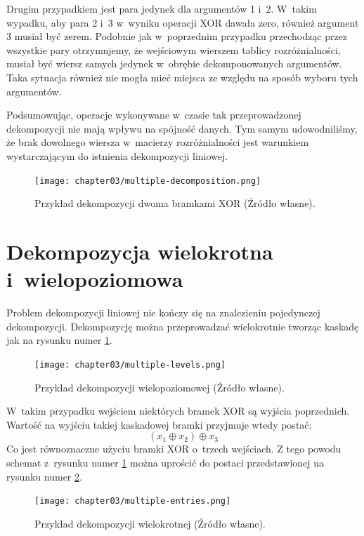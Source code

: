 Drugim przypadkiem jest para jedynek dla argumentów 1 i~2.
W~takim wypadku,
aby para 2 i~3 w~wyniku operacji XOR dawała zero,
również argument 3 musiał być zerem.
Podobnie jak w~poprzednim przypadku przechodząc przez wszystkie pary otrzymujemy,
że wejściowym wierszem tablicy rozróżnialności,
musiał być wiersz samych jedynek w~obrębie dekomponowanych argumentów.
Taka sytuacja również nie mogła mieć miejsca ze względu na sposób wyboru tych argumentów.

Podsumowując,
operacje wykonywane w~czasie tak przeprowadzonej dekompozycji nie mają wpływu na spójność danych.
Tym samym udowodniliśmy,
że brak dowolnego wiersza w~macierzy rozróżnialności jest warunkiem wystarczającym do istnienia dekompozycji liniowej.

\begin{figure}[H]
\centering
\texttt{[image: chapter03/multiple-decomposition.png]}
\caption{Przykład dekompozycji dwoma bramkami XOR (Źródło własne).}
\end{figure}

\section{Dekompozycja wielokrotna i~wielopoziomowa}

Problem dekompozycji liniowej nie kończy się na znalezieniu pojedynczej dekompozycji.
Dekompozycję można przeprowadzać wielokrotnie tworząc kaskadę jak na rysunku numer \ref{fig:multiple-levels}.

\begin{figure}[H]
\centering
\texttt{[image: chapter03/multiple-levels.png]}
\caption{Przykład dekompozycji wielopoziomowej (Źródło własne).}
\label{fig:multiple-levels}
\end{figure}

W~takim przypadku wejściem niektórych bramek XOR są wyjścia poprzednich.
Wartość na wyjściu takiej kaskadowej bramki przyjmuje wtedy postać:
\begin{equation}
(x_1 \oplus x_2) \oplus x_3
\end{equation}
Co jest równoznaczne użyciu bramki XOR o~trzech wejściach.
Z tego powodu schemat z~rysunku numer \ref{fig:multiple-levels} można uprościć do postaci przedstawionej na rysunku numer \ref{fig:multiple-entries}.

\begin{figure}[H]
\centering
\texttt{[image: chapter03/multiple-entries.png]}
\caption{Przykład dekompozycji wielokrotnej (Źródło własne).}
\label{fig:multiple-entries}
\end{figure}

